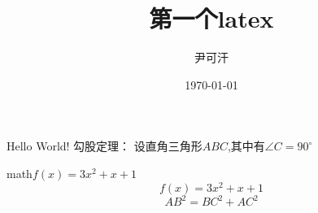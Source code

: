 \documentclass{ctexart}%
\title{\heiti 第一个latex}%
\author{\kaishu 尹可汗 }
\date{\today}
\newcommand{\degree}{^\circ}
\begin{document}
	\maketitle
	
	Hello World! 
	勾股定理：
	设直角三角形$ABC$,其中有$\angle C=90\degree$
	
	math$f(x)=3x^2+x+1$
	$$f(x)=3x^2+x+1$$
	\begin{equation}%
		AB^2=BC^2+AC^2
	\end{equation}
\end{document}
